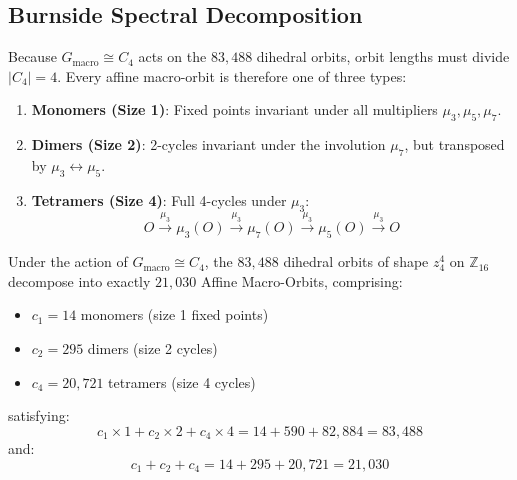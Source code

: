 \subsection{Burnside Spectral Decomposition}

Because $G_{\text{macro}} \cong C_4$ acts on the $83{,}488$ dihedral orbits, orbit lengths must divide $|C_4| = 4$. Every affine macro-orbit is therefore one of three types:
\begin{enumerate}
    \item \textbf{Monomers (Size 1)}: Fixed points invariant under all multipliers $\mu_3, \mu_5, \mu_7$.
    \item \textbf{Dimers (Size 2)}: 2-cycles invariant under the involution $\mu_7$, but transposed by $\mu_3 \leftrightarrow \mu_5$.
    \item \textbf{Tetramers (Size 4)}: Full 4-cycles under $\mu_3$:
    \[
    O \xrightarrow{\mu_3} \mu_3(O) \xrightarrow{\mu_3} \mu_7(O) \xrightarrow{\mu_3} \mu_5(O) \xrightarrow{\mu_3} O
    \]
\end{enumerate}

\begin{theorem}
\label{thm:spectral-decomposition-z44}
Under the action of $G_{\text{macro}} \cong C_4$, the $83{,}488$ dihedral orbits of shape $z_4^4$ on $\mathbb{Z}_{16}$ decompose into exactly $21{,}030$ Affine Macro-Orbits, comprising:
\begin{itemize}
    \item $c_1 = 14$ monomers (size 1 fixed points)
    \item $c_2 = 295$ dimers (size 2 cycles)
    \item $c_4 = 20{,}721$ tetramers (size 4 cycles)
\end{itemize}
satisfying:
\begin{equation}
\label{eqn:spectral-sum}
c_1 \times 1 + c_2 \times 2 + c_4 \times 4 = 14 + 590 + 82{,}884 = 83{,}488
\end{equation}
and:
\begin{equation}
\label{eqn:total-macro-sum}
c_1 + c_2 + c_4 = 14 + 295 + 20{,}721 = 21{,}030
\end{equation}
\end{theorem}

